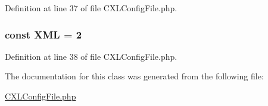 Definition at line 37 of file CXLConfigFile.php.

\hypertarget{classCXLConfigFile_a5f33028773b1db8e11fcd34516dacb28}{
\subsubsection[{XML}]{\setlength{\rightskip}{0pt plus 5cm}const {\bf XML} = 2}}
\label{classCXLConfigFile_a5f33028773b1db8e11fcd34516dacb28}


Definition at line 38 of file CXLConfigFile.php.



The documentation for this class was generated from the following file:\begin{DoxyCompactItemize}
\item 
\hyperlink{CXLConfigFile_8php}{CXLConfigFile.php}\end{DoxyCompactItemize}
